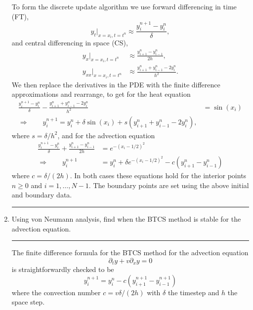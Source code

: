 \documentclass[10pt]{article}
\begin{document}
\begin{enumerate}
  To form the discrete update algorithm we use forward differencing in
  time (FT),
  \begin{equation*}
    y_t|_{x=x_i, t = t^n} \approx \frac{y_i^{n+1} - y_i^{n}}{\delta},
  \end{equation*}
  and central differencing in space (CS), 
  \begin{align*}
    y_x|_{x=x_i, t = t^n} & \approx \frac{y_{i+1}^{n} - y_{i-1}^{n}}{2
      h}, \\
    y_{xx}|_{x=x_i, t = t^n} & \approx \frac{y_{i+1}^{n} + y_{i-1}^{n}
      - 2 y_i^n}{h^2}.
  \end{align*}
  We then replace the derivatives in the PDE with the finite
  difference approximations and rearrange, to get for the heat equation
  \begin{align*}
    \frac{y_i^{n+1} - y_i^{n}}{\delta} - \frac{y_{i+1}^{n} + y_{i-1}^{n}
      - 2 y_i^n}{h^2} & = \sin(x_i) \\
    \Rightarrow \qquad y_i^{n+1} = y_i^n + \delta \sin(x_i) + s \left(
      y_{i+1}^{n} + y_{i-1}^{n} - 2 y_i^n \right),
  \end{align*}
  where $s = \delta / h^2$, and for the advection equation
  \begin{align*}
    \frac{y_i^{n+1} - y_i^{n}}{\delta} + \frac{y_{i+1}^{n} -
      y_{i-1}^{n}}{2 h} & = e^{-(x_i - 1/2)^2} \\
    \Rightarrow \qquad y_i^{n+1} & = y_i^n + \delta e^{-(x_i - 1/2)^2}
    - c \left( y_{i+1}^n - y_{i-1}^n \right)
  \end{align*}
  where $c = \delta / (2 h)$. In both cases these equations hold for
  the interior points $n \ge 0$ and $i = 1, \dots, N-1$. The boundary
  points are set using the above initial and boundary data.
  \begin{center}
    \rule{0.9\textwidth}{.1pt}
  \end{center}
\item Using von Neumann analysis, find when the BTCS method is stable
  for the advection equation.
  \begin{center}
    \rule{0.9\textwidth}{.1pt}
  \end{center}
  The finite difference formula for the BTCS method for the advection
  equation
  \begin{equation*}
    \partial_t y + v \partial_x y = 0
  \end{equation*}
  is straightforwardly checked to be
  \begin{equation*}
    y_i^{n+1} = y_i^n - c \left( y_{i+1}^{n+1} - y_{i-1}^{n+1} \right)
  \end{equation*}
  where the convection number $c = v \delta / (2 h)$ with $\delta$ the
  timestep and $h$ the space step. 


\end{enumerate}
\end{document}
